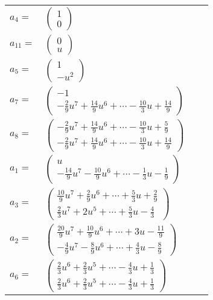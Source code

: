 \documentclass[1p]{elsarticle_modified}
\theoremstyle{definition}
\begin{document}
\begin{tabular}{m{7pt} m{180pt} m{7pt} m{180pt} }
\flushright $a_{4}=$&$\begin{pmatrix}1\\0\end{pmatrix}$ \\
\flushright $a_{11}=$&$\begin{pmatrix}0\\u\end{pmatrix}$ \\
\flushright $a_{5}=$&$\begin{pmatrix}1\\- u^2\end{pmatrix}$ \\
\flushright $a_{7}=$&$\begin{pmatrix}-1\\-\frac{2}{9} u^7+\frac{14}{9} u^6+\cdots-\frac{10}{3} u+\frac{14}{9}\end{pmatrix}$ \\
\flushright $a_{8}=$&$\begin{pmatrix}-\frac{2}{9} u^7+\frac{14}{9} u^6+\cdots-\frac{10}{3} u+\frac{5}{9}\\-\frac{2}{9} u^7+\frac{14}{9} u^6+\cdots-\frac{10}{3} u+\frac{14}{9}\end{pmatrix}$ \\
\flushright $a_{1}=$&$\begin{pmatrix}u\\-\frac{14}{9} u^7-\frac{10}{9} u^6+\cdots-\frac{1}{3} u-\frac{1}{9}\end{pmatrix}$ \\
\flushright $a_{3}=$&$\begin{pmatrix}\frac{10}{9} u^7+\frac{2}{9} u^6+\cdots+\frac{5}{3} u+\frac{2}{9}\\\frac{2}{3} u^7+2 u^5+\cdots+\frac{5}{3} u-\frac{4}{3}\end{pmatrix}$ \\
\flushright $a_{2}=$&$\begin{pmatrix}\frac{20}{9} u^7+\frac{10}{9} u^6+\cdots+3 u-\frac{11}{9}\\-\frac{4}{9} u^7-\frac{8}{9} u^6+\cdots+\frac{4}{3} u-\frac{8}{9}\end{pmatrix}$ \\
\flushright $a_{6}=$&$\begin{pmatrix}\frac{2}{3} u^6+\frac{2}{3} u^5+\cdots-\frac{4}{3} u+\frac{1}{3}\\\frac{2}{3} u^6+\frac{2}{3} u^5+\cdots-\frac{4}{3} u+\frac{1}{3}\end{pmatrix}$ \\

\end{tabular}
\end{document}
